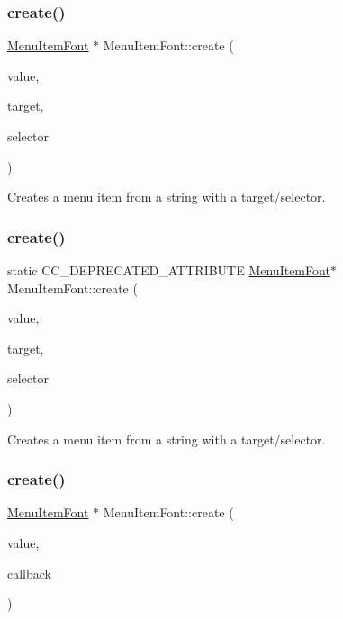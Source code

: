 \subsubsection{\texorpdfstring{create()}{create()}\hspace{0.1cm}{\footnotesize\ttfamily [3/6]}}
{\footnotesize\ttfamily \hyperlink{classMenuItemFont}{Menu\+Item\+Font} $\ast$ Menu\+Item\+Font\+::create (\begin{DoxyParamCaption}\item[{const std\+::string \&}]{value,  }\item[{\hyperlink{classRef}{Ref} $\ast$}]{target,  }\item[{S\+E\+L\+\_\+\+Menu\+Handler}]{selector }\end{DoxyParamCaption})\hspace{0.3cm}{\ttfamily [static]}}

Creates a menu item from a string with a target/selector. \mbox{\label{classMenuItemFont_a13d8b74a0e1f818a26e55f92b9b91eec}} 
\subsubsection{\texorpdfstring{create()}{create()}\hspace{0.1cm}{\footnotesize\ttfamily [4/6]}}
{\footnotesize\ttfamily static C\+C\+\_\+\+D\+E\+P\+R\+E\+C\+A\+T\+E\+D\+\_\+\+A\+T\+T\+R\+I\+B\+U\+TE \hyperlink{classMenuItemFont}{Menu\+Item\+Font}$\ast$ Menu\+Item\+Font\+::create (\begin{DoxyParamCaption}\item[{const std\+::string \&}]{value,  }\item[{\hyperlink{classRef}{Ref} $\ast$}]{target,  }\item[{S\+E\+L\+\_\+\+Menu\+Handler}]{selector }\end{DoxyParamCaption})\hspace{0.3cm}{\ttfamily [static]}}

Creates a menu item from a string with a target/selector. \mbox{\label{classMenuItemFont_a1eef04399142b10da39c8c3ee08fdb56}} 
\subsubsection{\texorpdfstring{create()}{create()}\hspace{0.1cm}{\footnotesize\ttfamily [5/6]}}
{\footnotesize\ttfamily \hyperlink{classMenuItemFont}{Menu\+Item\+Font} $\ast$ Menu\+Item\+Font\+::create (\begin{DoxyParamCaption}\item[{const std\+::string \&}]{value,  }\item[{const cc\+Menu\+Callback \&}]{callback }\end{DoxyParamCaption})\hspace{0.3cm}{\ttfamily [static]}}

